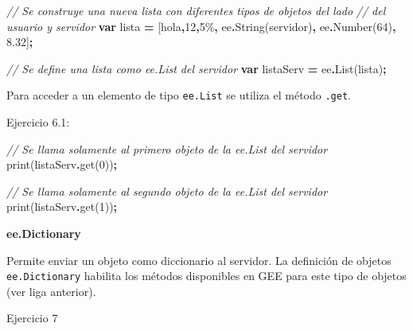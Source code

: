 \documentclass[
  12pt,
  letterpaper,
  twoside]{book}
\newenvironment{Shaded}{\begin{snugshade}}{\end{snugshade}}
\newcommand{\CommentTok}[1]{\textcolor[rgb]{0.56,0.35,0.01}{\textit{#1}}}
\newcommand{\DecValTok}[1]{\textcolor[rgb]{0.00,0.00,0.81}{#1}}
\newcommand{\FloatTok}[1]{\textcolor[rgb]{0.00,0.00,0.81}{#1}}
\newcommand{\FunctionTok}[1]{\textcolor[rgb]{0.00,0.00,0.00}{#1}}
\newcommand{\KeywordTok}[1]{\textcolor[rgb]{0.13,0.29,0.53}{\textbf{#1}}}
\newcommand{\NormalTok}[1]{#1}
\newcommand{\OperatorTok}[1]{\textcolor[rgb]{0.81,0.36,0.00}{\textbf{#1}}}
\newcommand{\StringTok}[1]{\textcolor[rgb]{0.31,0.60,0.02}{#1}}
\begin{document}
\begin{Shaded}
\begin{Highlighting}[]
\CommentTok{// Se construye una nueva lista con diferentes tipos de objetos del lado }
\CommentTok{// del usuario y servidor}
\KeywordTok{var}\NormalTok{ lista }\OperatorTok{=}\NormalTok{ [}\StringTok{\textquotesingle{}hola\textquotesingle{}}\OperatorTok{,}\StringTok{\textquotesingle{}12\textquotesingle{}}\OperatorTok{,}\StringTok{\textquotesingle{}5\%\textquotesingle{}}\OperatorTok{,}\NormalTok{ ee}\OperatorTok{.}\FunctionTok{String}\NormalTok{(}\StringTok{\textquotesingle{}servidor\textquotesingle{}}\NormalTok{)}\OperatorTok{,}\NormalTok{ ee}\OperatorTok{.}\FunctionTok{Number}\NormalTok{(}\DecValTok{64}\NormalTok{)}\OperatorTok{,} \FloatTok{8.32}\NormalTok{]}\OperatorTok{;}

\CommentTok{// Se define una lista como ee.List del servidor }
\KeywordTok{var}\NormalTok{ listaServ }\OperatorTok{=}\NormalTok{ ee}\OperatorTok{.}\FunctionTok{List}\NormalTok{(lista)}\OperatorTok{;}             
\end{Highlighting}
\end{Shaded}

Para acceder a un elemento de tipo \texttt{ee.List} se utiliza el método \texttt{.get}.

Ejercicio 6.1:

\begin{Shaded}
\begin{Highlighting}[]
\CommentTok{// Se llama solamente al primero objeto de la ee.List del servidor}
\FunctionTok{print}\NormalTok{(listaServ}\OperatorTok{.}\FunctionTok{get}\NormalTok{(}\DecValTok{0}\NormalTok{))}\OperatorTok{;}   

\CommentTok{// Se llama solamente al segundo objeto de la ee.List del servidor}
\FunctionTok{print}\NormalTok{(listaServ}\OperatorTok{.}\FunctionTok{get}\NormalTok{(}\DecValTok{1}\NormalTok{))}\OperatorTok{;} 
\end{Highlighting}
\end{Shaded}

\textbf{ee.Dictionary}

Permite enviar un objeto como diccionario al servidor. La definición de objetos \texttt{ee.Dictionary} habilita los métodos disponibles en GEE para este tipo de objetos (ver liga anterior).

Ejercicio 7
\end{document}
